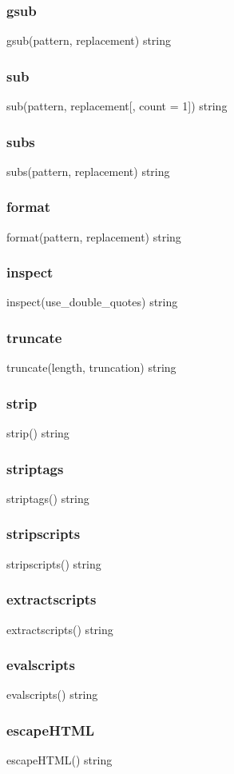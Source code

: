 {{\subsubsection*{gsub}
gsub(pattern, replacement) \rightarrow string
\subsubsection*{sub}
sub(pattern, replacement[, count = 1]) \rightarrow string
\subsubsection*{subs}
subs(pattern, replacement) \rightarrow string
\subsubsection*{format}
format(pattern, replacement) \rightarrow string
\subsubsection*{inspect} 
inspect(use_double_quotes) \rightarrow string
\subsubsection*{truncate}
truncate(length, truncation) \rightarrow string
\subsubsection*{strip}
strip() \rightarrow string
\subsubsection*{striptags}
striptags() \rightarrow string
\subsubsection*{stripscripts}
stripscripts() \rightarrow string
\subsubsection*{extractscripts}
extractscripts() \rightarrow string
\subsubsection*{evalscripts}
evalscripts() \rightarrow string
\subsubsection*{escapeHTML}
escapeHTML() \rightarrow string
}}
